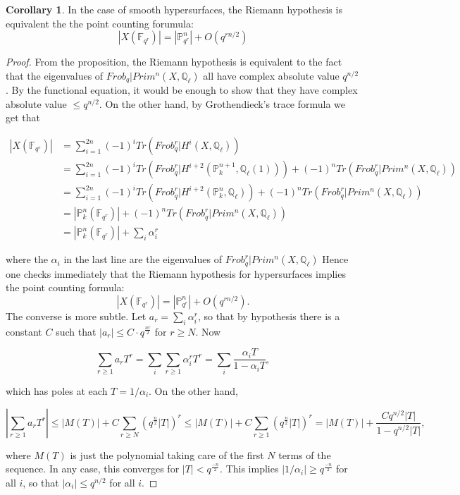 \documentclass{ucbthesis}
\theoremstyle{definition}
\theoremstyle{theorem}
\newtheorem{cor}[thm]{Corollary}
\begin{document}
\begin{cor}
In the case of smooth hypersurfaces, the Riemann hypothesis is equivalent the the point counting forumula:
$$|X(\mathbb{F}_{q^{r}})| = |\mathbb{P}^{n}_{q^{r}}| + O(q^{rn/2})$$
\end{cor}
\begin{proof}
From the proposition, the Riemann hypothesis is equivalent to the fact that the eigenvalues of $Frob_{q}|Prim^{n}(X,\mathbb{Q}_{\ell})$ all have complex absolute value $q^{n/2}$. By the functional equation, it would be enough to show that they have complex absolute value $\leq q^{n/2}$. On the other hand, by Grothendieck's trace formula we get that 

\begin{align*}
|X(\mathbb{F}_{q^{r}})| &= \sum\limits_{i=1}^{2n}(-1)^{i}Tr(Frob_{q}^{r}|H^{i}(X,\mathbb{Q}_{\ell}))\\
&= \sum\limits_{i=1}^{2n}(-1)^{i}Tr(Frob_{q}^{r}|H^{i+2}(\mathbb{P}_{k}^{n+1},\mathbb{Q}_{\ell}(1))) + 
(-1)^n Tr(Frob_{q}^{r}|Prim^{n}(X,\mathbb{Q}_{\ell})) \\
&= \sum\limits_{i=1}^{2n}(-1)^{i}Tr(Frob_{q}^{r}|H^{i+2}(\mathbb{P}_{k}^{n},\mathbb{Q}_{\ell})) + 
(-1)^n Tr(Frob_{q}^{r}|Prim^{n}(X,\mathbb{Q}_{\ell})) \\
&= |\mathbb{P}_{k}^{n}(\mathbb{F}_{q^{r}})|  + (-1)^n Tr(Frob_{q}^{r}|Prim^{n}(X,\mathbb{Q}_{\ell}))\\
&= |\mathbb{P}_{k}^{n}(\mathbb{F}_{q^{r}})| + \sum_{i} \alpha_{i}^{r}
\end{align*}

where the $\alpha_{i}$ in the last line are the eigenvalues of $Frob_{q}^{r}|Prim^{n}(X,\mathbb{Q}_{\ell})$
Hence one checks immediately that the Riemann hypothesis for hypersurfaces implies the point counting formula:
$$|X(\mathbb{F}_{q^{r}})| = |\mathbb{P}^{n}_{q^{r}}| + O(q^{rn/2}).$$
The converse is more subtle. Let $a_{r} = \sum\limits_{i}\alpha_{i}^{r}$, so that by hypothesis there is a constant $C$ such that $|a_{r}|\leq C\cdot q^{\frac{nr}{2}}$ for $r\geq N$. Now

$$\sum\limits_{r \geq 1}a_{r}T^{r} = \sum\limits_{i}\sum\limits_{r\geq 1}\alpha_{i}^{r}T^{r} = \sum\limits_{i}\frac{\alpha_{i}T}{1-\alpha_{i}T},$$

which has poles at each $T=1/\alpha_{i}$. On the other hand, 

$$|\sum\limits_{r\geq 1}a_{r}T^{r}| \leq |M(T)| + C\sum\limits_{r\geq N}(q^{\frac{n}{2}}|T|)^{r}    \leq   |M(T)| + C\sum\limits_{r\geq 1}(q^{\frac{n}{2}}|T|)^{r} = |M(T)| + \frac{Cq^{n/2}|T|}{1-q^{n/2}|T|},$$

where $M(T)$ is just the polynomial taking care of the first $N$ terms of the sequence. In any case, this converges for $|T| < q^{\frac{-n}{2}}$. This implies $|1/\alpha_{i}| \geq q^{\frac{-n}{2}}$ for all $i$, so that $|\alpha_{i}| \leq q^{n/2}$ for all $i$. 
\end{proof}
\end{document}
